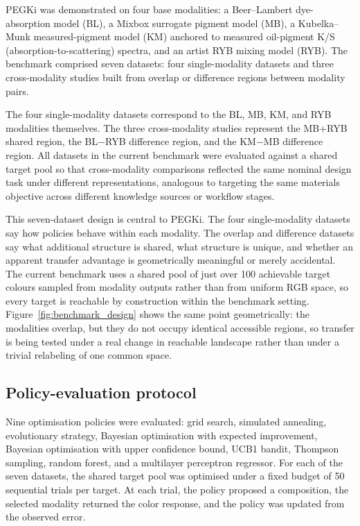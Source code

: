 \documentclass[twoside,twocolumn,9pt]{article}
\begin{document}
PEGKi was demonstrated on four base modalities: a Beer--Lambert dye-absorption model (BL), a Mixbox surrogate pigment model (MB),\cite{Sochorova2021} a Kubelka--Munk measured-pigment model (KM) anchored to measured oil-pigment K/S (absorption-to-scattering) spectra,\cite{Kubelka1931,Wiersma2025Hyperspectral} and an artist RYB mixing model (RYB).\cite{Gossett2004RYB} The benchmark comprised seven datasets: four single-modality datasets and three cross-modality studies built from overlap or difference regions between modality pairs.

The four single-modality datasets correspond to the BL, MB, KM, and RYB modalities themselves. The three cross-modality studies represent the MB+RYB shared region, the BL$-$RYB difference region, and the KM$-$MB difference region. All datasets in the current benchmark were evaluated against a shared target pool so that cross-modality comparisons reflected the same nominal design task under different representations, analogous to targeting the same materials objective across different knowledge sources or workflow stages.

This seven-dataset design is central to PEGKi. The four single-modality datasets say how policies behave within each modality. The overlap and difference datasets say what additional structure is shared, what structure is unique, and whether an apparent transfer advantage is geometrically meaningful or merely accidental. The current benchmark uses a shared pool of just over 100 achievable target colours sampled from modality outputs rather than from uniform RGB space, so every target is reachable by construction within the benchmark setting.
Figure~\ref{fig:benchmark_design} shows the same point geometrically: the modalities overlap, but they do not occupy identical accessible regions, so transfer is being tested under a real change in reachable landscape rather than under a trivial relabeling of one common space.

\subsection{Policy-evaluation protocol}

Nine optimisation policies were evaluated: grid search, simulated annealing, evolutionary strategy, Bayesian optimisation with expected improvement, Bayesian optimisation with upper confidence bound, UCB1 bandit, Thompson sampling, random forest, and a multilayer perceptron regressor. For each of the seven datasets, the shared target pool was optimised under a fixed budget of 50 sequential trials per target. At each trial, the policy proposed a composition, the selected modality returned the color response, and the policy was updated from the observed error.
\end{document}
